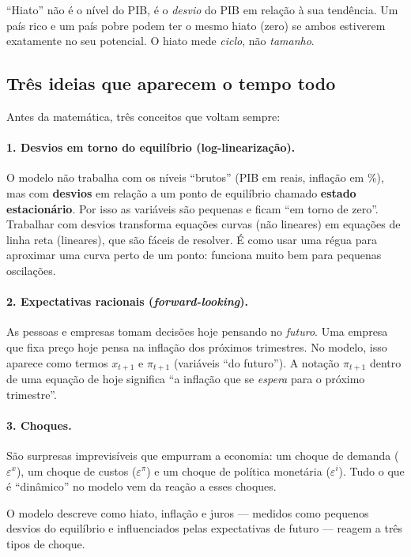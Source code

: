 \documentclass[11pt,a4paper]{article}
\begin{document}
\begin{atencao}
``Hiato'' não é o nível do PIB, é o \emph{desvio} do PIB em relação à sua tendência. Um país rico e um
país pobre podem ter o mesmo hiato (zero) se ambos estiverem exatamente no seu potencial. O hiato mede
\emph{ciclo}, não \emph{tamanho}.
\end{atencao}

\subsection{Três ideias que aparecem o tempo todo}
Antes da matemática, três conceitos que voltam sempre:

\paragraph{1. Desvios em torno do equilíbrio (log-linearização).} O modelo não trabalha com os níveis
``brutos'' (PIB em reais, inflação em \%), mas com \textbf{desvios} em relação a um ponto de
equilíbrio chamado \textbf{estado estacionário}. Por isso as variáveis são pequenas e ficam ``em torno
de zero''. Trabalhar com desvios transforma equações curvas (não lineares) em equações de linha reta
(lineares), que são fáceis de resolver. É como usar uma régua para aproximar uma curva perto de um
ponto: funciona muito bem para pequenas oscilações.

\paragraph{2. Expectativas racionais (\emph{forward-looking}).} As pessoas e empresas tomam decisões
hoje pensando no \emph{futuro}. Uma empresa que fixa preço hoje pensa na inflação dos próximos
trimestres. No modelo, isso aparece como termos $x_{t+1}$ e $\pi_{t+1}$ (variáveis ``do futuro''). A
notação $\pi_{t+1}$ dentro de uma equação de hoje significa ``a inflação que se \emph{espera} para o
próximo trimestre''.

\paragraph{3. Choques.} São surpresas imprevisíveis que empurram a economia: um choque de demanda
($\varepsilon^x$), um choque de custos ($\varepsilon^\pi$) e um choque de política monetária
($\varepsilon^i$). Tudo o que é ``dinâmico'' no modelo vem da reação a esses choques.

\begin{resumo}
O modelo descreve como hiato, inflação e juros --- medidos como pequenos desvios do equilíbrio e
influenciados pelas expectativas de futuro --- reagem a três tipos de choque.
\end{resumo}
\end{document}
